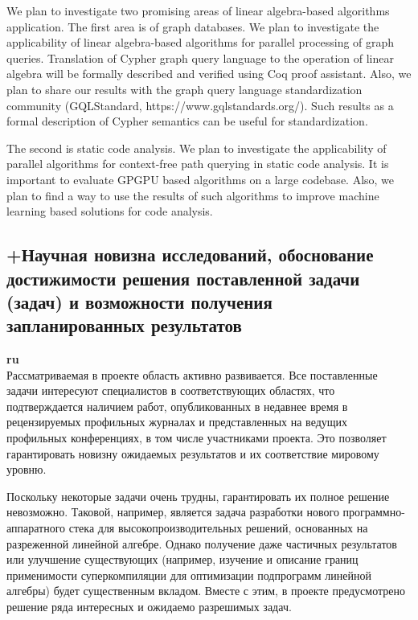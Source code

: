 \documentclass[12pt]{article}  %
\theoremstyle{remark}
\begin{document}
 We plan to investigate two promising areas of linear algebra-based algorithms application. The first area is of graph databases. We plan to investigate the applicability of linear algebra-based algorithms for parallel processing of graph queries. Translation of Cypher graph query language to the operation of linear algebra will be formally described and verified using Coq proof assistant. Also, we plan to share our results with the graph query language standardization community (GQLStandard, https://www.gqlstandards.org/). Such results as a formal description of Cypher semantics can be useful for standardization.
 
 The second is static code analysis. We plan to investigate the applicability of parallel algorithms for context-free path querying in static code analysis. It is important to evaluate GPGPU based algorithms on a large codebase. Also, we plan to find a way to use the results of such algorithms to improve machine learning based solutions for code analysis.

\subsection{+Научная новизна исследований, обоснование достижимости решения поставленной задачи (задач) и возможности получения запланированных результатов}

\textbf{ru}\\

Рассматриваемая в проекте область активно развивается. Все поставленные задачи интересуют специалистов в соответствующих областях, что подтверждается наличием работ, опубликованных в недавнее время в рецензируемых профильных журналах и представленных на ведущих профильных конференциях, в том числе участниками проекта. Это позволяет гарантировать новизну ожидаемых результатов и их соответствие мировому уровню.

Поскольку некоторые задачи очень трудны, гарантировать их полное решение невозможно. Таковой, например, является задача разработки нового программно-аппаратного стека для высокопроизводительных решений, основанных на разреженной линейной алгебре. Однако получение даже частичных результатов или улучшение существующих (например, изучение и описание границ применимости суперкомпиляции для оптимизации подпрограмм линейной алгебры) будет существенным вкладом. Вместе с этим, в проекте предусмотрено решение ряда интересных и ожидаемо разрешимых задач.
\end{document}
